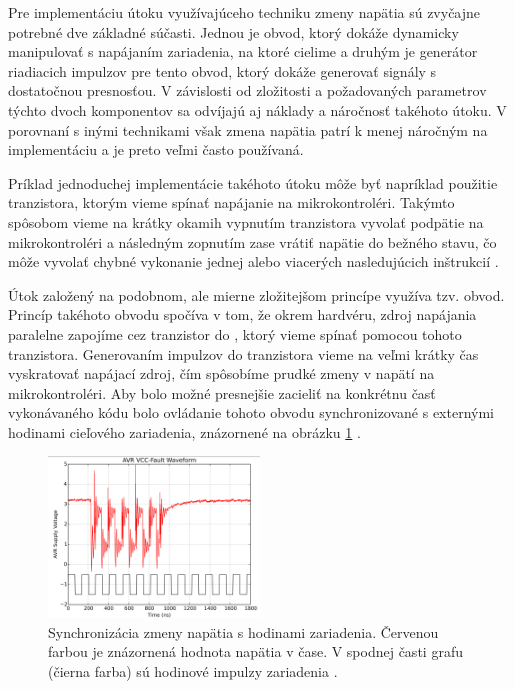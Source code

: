 Pre implementáciu útoku využívajúceho techniku zmeny napätia sú zvyčajne potrebné dve základné súčasti. Jednou je obvod, ktorý dokáže dynamicky manipulovať s napájaním zariadenia, na ktoré cielime a druhým je generátor riadiacich impulzov pre tento obvod, ktorý dokáže generovať signály s dostatočnou presnosťou. V závislosti od zložitosti a požadovaných parametrov týchto dvoch komponentov sa odvíjajú aj náklady a náročnosť takéhoto útoku. V porovnaní s inými technikami však zmena napätia patrí k menej náročným na implementáciu a je preto veľmi často používaná. 

Príklad jednoduchej implementácie takéhoto útoku môže byť napríklad použitie tranzistora, ktorým vieme spínať napájanie na mikrokontroléri. Takýmto spôsobom vieme na krátky okamih vypnutím tranzistora vyvolať podpätie na mikrokontroléri a následným zopnutím zase vrátiť napätie do bežného stavu, čo môže vyvolať chybné vykonanie jednej alebo viacerých nasledujúcich inštrukcií \cite{vccOnTheCheap}.

Útok založený na podobnom, ale mierne zložitejšom princípe využíva tzv.  obvod. Princíp takéhoto obvodu spočíva v tom, že okrem hardvéru, zdroj napájania paralelne zapojíme cez tranzistor do , ktorý vieme spínať pomocou tohoto tranzistora. Generovaním impulzov do tranzistora vieme na veľmi krátky čas vyskratovať napájací zdroj, čím spôsobíme prudké zmeny v napätí na mikrokontroléri. Aby bolo možné presnejšie zacieliť na konkrétnu časť vykonávaného kódu bolo ovládanie tohoto obvodu synchronizované s externými hodinami cieľového zariadenia, znázornené na obrázku \ref{obr:vccSync} \cite{crowbars}.

\begin{figure}
    \centerline{\includegraphics[width=0.5\textwidth]{images/vccSync.png}}
    \caption[Synchronizácia zmeny napätia s hodinami zariadenia.]{Synchronizácia zmeny napätia s hodinami zariadenia. Červenou farbou je znázornená hodnota napätia v čase. V spodnej časti grafu (čierna farba) sú hodinové impulzy zariadenia \cite{crowbars}.}
    \label{obr:vccSync}
\end{figure}

